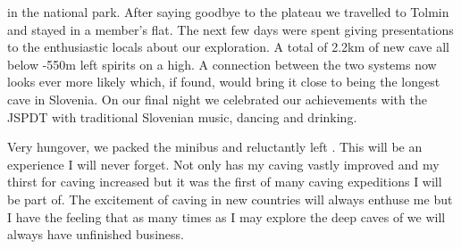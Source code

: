  in the
national park. After saying goodbye to the plateau we travelled to \passage[town]Tolmin and stayed in a member's
flat. The next few days were spent giving presentations to the enthusiastic locals about our exploration. A total of 2.2km of new cave all below -550m left spirits on a high. A connection between the two
systems now looks ever more likely which, if found, would bring it close to being the longest cave in
Slovenia. On our final night we celebrated our achievements with the JSPDT with traditional Slovenian
music, dancing and drinking.



Very hungover, we packed the minibus and reluctantly left . This will be an experience I
will never forget. Not only has my caving vastly improved and my thirst for caving increased but it
was the first of many caving expeditions I will be part of. The excitement of caving in new countries
will always enthuse me but I have the feeling that as many times as I may explore the deep caves of
 we will always have unfinished business.


